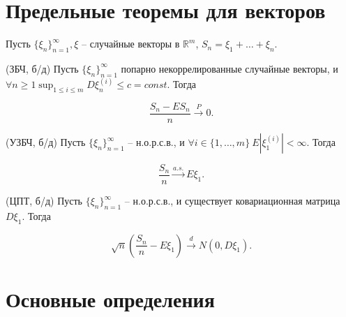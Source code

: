 \section{Предельные теоремы для векторов}

Пусть $\displaystyle \{\xi _{n}\}_{n=1}^{\infty } ,\xi $ -- случайные векторы в $\displaystyle \mathbb{R}^{m}$, $\displaystyle S_{n} =\xi _{1} +\dotsc +\xi _{n}$.
\begin{theorem}
	(ЗБЧ, б/д) Пусть $\displaystyle \{\xi _{n}\}_{n=1}^{\infty}$ попарно некоррелированные случайные векторы, и $\displaystyle \forall n \ge 1 \sup_{1\le i\le m} D\xi _{n}^{( i)} \leqslant c=const$. Тогда
	
	
	\begin{equation*}
		\frac{S_{n} -ES_{n}}{n}\xrightarrow{P} 0.
	\end{equation*}
\end{theorem}
\begin{theorem}
	(УЗБЧ, б/д) Пусть $\displaystyle \{\xi _{n}\}_{n=1}^{\infty }$ -- н.о.р.с.в., и $\displaystyle \forall i\in \{1,\dotsc ,m\} \ E\left| \xi _{1}^{( i)}\right| < \infty $. Тогда
	
	
	\begin{equation*}
		\frac{S_{n}}{n}\xrightarrow{a.s.} E\xi_{1} .
	\end{equation*}
\end{theorem}
\begin{theorem}
	(ЦПТ, б/д) Пусть $\displaystyle \{\xi _{n}\}_{n=1}^{\infty }$ -- н.о.р.с.в., и существует ковариационная матрица $\displaystyle D\xi _{1}$. Тогда
	
	
	\begin{equation*}
		\sqrt{n}\left(\frac{S_{n}}{n} -E\xi_{1}\right)\xrightarrow{d} N( 0,D\xi_{1}) .
	\end{equation*}
\end{theorem}

\section{Основные определения}

